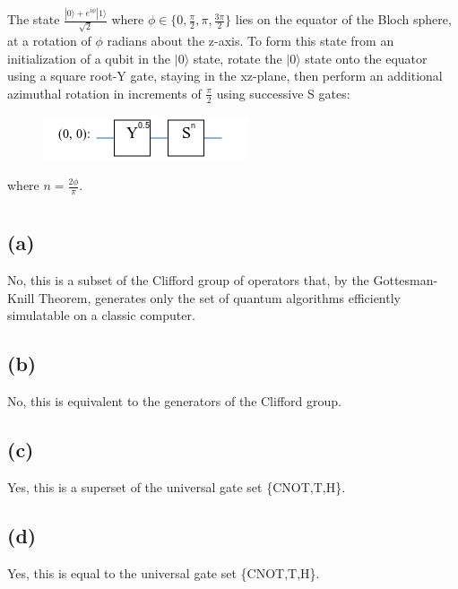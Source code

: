 \documentclass{article}
\begin{document}
The state $\frac{|0\rangle+e^{i\phi}|1\rangle}{\sqrt{2}}$ where $\phi\in\{0,\frac{\pi}{2},\pi,\frac{3\pi}{2}\}$ lies on the equator of the Bloch sphere, at a rotation of $\phi$ radians about the z-axis. To form this state from an initialization of a qubit in the $|0\rangle$ state, rotate the $|0\rangle$ state onto the equator using a square root-Y gate, staying in the xz-plane, then perform an additional azimuthal rotation in increments of $\frac{\pi}{2}$ using successive S gates:

\begin{figure}[H]
  \centering
  \includegraphics[width=0.4\linewidth]
  {images/circuit_b.png}
\end{figure}

where $n=\frac{2\phi}{\pi}$.

\section{}

\subsection*{(a)}

No, this is a subset of the Clifford group of operators that, by the Gottesman-Knill Theorem, generates only the set of quantum algorithms efficiently simulatable on a classic computer.

\subsection*{(b)}

No, this is equivalent to the generators of the Clifford group.

\subsection*{(c)}

Yes, this is a superset of the universal gate set \{CNOT,T,H\}.

\subsection*{(d)}

Yes, this is equal to the universal gate set \{CNOT,T,H\}.
\end{document}
